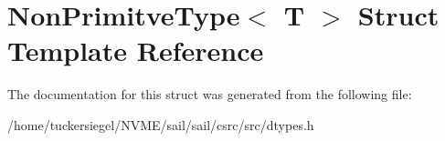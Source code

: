 \hypertarget{structNonPrimitveType}{}\section{Non\+Primitve\+Type$<$ T $>$ Struct Template Reference}
\label{structNonPrimitveType}


The documentation for this struct was generated from the following file\+:\begin{DoxyCompactItemize}
\item 
/home/tuckersiegel/\+N\+V\+M\+E/sail/sail/csrc/src/dtypes.\+h\end{DoxyCompactItemize}
